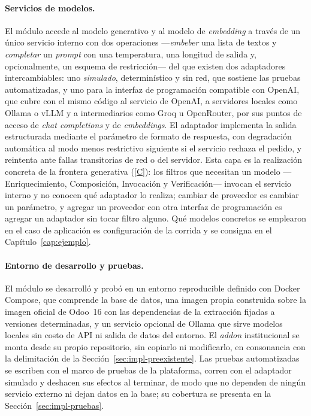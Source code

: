 \documentclass[12pt]{report}
\DeclareRobustCommand{\resp}[1]{\hyperref[tab:registro-responsabilidades]{\textcolor{respcolor}{[#1]}}}
\begin{document}
\paragraph{Servicios de modelos.} El módulo accede al modelo generativo y al modelo de \textit{embedding} a través de un único servicio interno con dos operaciones ---\textit{embeber} una lista de textos y \textit{completar} un \textit{prompt} con una temperatura, una longitud de salida y, opcionalmente, un esquema de restricción--- del que existen dos adaptadores intercambiables: uno \textit{simulado}, determinístico y sin red, que sostiene las pruebas automatizadas, y uno para la interfaz de programación compatible con OpenAI, que cubre con el mismo código al servicio de OpenAI, a servidores locales como Ollama o vLLM y a intermediarios como Groq u OpenRouter, por sus puntos de acceso de \textit{chat completions} y de \textit{embeddings}. El adaptador implementa la salida estructurada mediante el parámetro de formato de respuesta, con degradación automática al modo menos restrictivo siguiente si el servicio rechaza el pedido, y reintenta ante fallas transitorias de red o del servidor. Esta capa es la realización concreta de la frontera generativa (\resp{C}): los filtros que necesitan un modelo ---Enriquecimiento, Composición, Invocación y Verificación--- invocan el servicio interno y no conocen qué adaptador lo realiza; cambiar de proveedor es cambiar un parámetro, y agregar un proveedor con otra interfaz de programación es agregar un adaptador sin tocar filtro alguno. Qué modelos concretos se emplearon en el caso de aplicación es configuración de la corrida y se consigna en el Capítulo~\ref{cap:ejemplo}.



\paragraph{Entorno de desarrollo y pruebas.} El módulo se desarrolló y probó en un entorno reproducible definido con Docker Compose, que comprende la base de datos, una imagen propia construida sobre la imagen oficial de Odoo~16 con las dependencias de la extracción fijadas a versiones determinadas, y un servicio opcional de Ollama que sirve modelos locales sin costo de API ni salida de datos del entorno. El \textit{addon} institucional se monta desde su propio repositorio, sin copiarlo ni modificarlo, en consonancia con la delimitación de la Sección~\ref{sec:impl-preexistente}. Las pruebas automatizadas se escriben con el marco de pruebas de la plataforma, corren con el adaptador simulado y deshacen sus efectos al terminar, de modo que no dependen de ningún servicio externo ni dejan datos en la base; su cobertura se presenta en la Sección~\ref{sec:impl-pruebas}.
\end{document}
